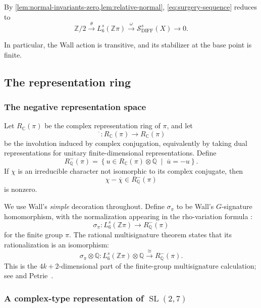 \documentclass[10pt,reqno]{amsart}
\numberwithin{equation}{section}
\theoremstyle{definition}
\theoremstyle{remark}
\newcommand{\Z}{\mathbb Z}
\newcommand{\Q}{\mathbb Q}
\newcommand{\C}{\mathbb C}
\newcommand{\DIFF}{\mathrm{DIFF}}
\newcommand{\cS}{\mathcal S}
\newcommand{\SL}{\operatorname{SL}}
\begin{document}
By \cref{lem:normal-invariants-zero,lem:relative-normal},
\eqref{eq:surgery-sequence} reduces to
\begin{equation}\label{eq:reduced-surgery-sequence}
\Z/2
\xrightarrow{\theta}
L_6^s(\Z\pi)
\xrightarrow{\omega}
\cS^s_{\DIFF}(X)
\longrightarrow0.
\end{equation}

In particular, the Wall action is transitive, and its stabilizer at
the base point is finite.

\subsection{The representation ring}

\subsubsection{The negative representation space}

Let \(R_{\C}(\pi)\) be the complex representation ring of \(\pi\), and
let
\[
\overline{\phantom{x}}\colon R_{\C}(\pi)\longrightarrow R_{\C}(\pi)
\]
be the involution induced by complex conjugation, equivalently by
taking dual representations for unitary finite-dimensional
representations.  Define
\[
R^-_{\Q}(\pi)
=
\left\{
u\in R_{\C}(\pi)\otimes\Q
\;\middle|\;
\overline{u}=-u
\right\}.
\]
If \(\chi\) is an irreducible character not isomorphic to its complex
conjugate, then
\[
\chi-\overline{\chi}\in R^-_{\Q}(\pi)
\]
is nonzero.

We use Wall's \emph{simple} decoration throughout.  Define
\(\sigma_\pi\) to be Wall's \(G\)-signature homomorphism, with the
normalization appearing in the rho-variation formula
\cite[Equation~(1.2)]{CrowleyMacko}:
\[
\sigma_\pi\colon L_6^s(\Z\pi)\longrightarrow R^-_{\Q}(\pi)
\]
for the finite group \(\pi\).  The rational multisignature theorem
states that its rationalization is an isomorphism:
\begin{equation}\label{eq:multisignature-rational}
\sigma_\pi\otimes\Q\colon
L_6^s(\Z\pi)\otimes\Q
\xrightarrow{\;\cong\;}
R^-_{\Q}(\pi).
\end{equation}
This is the \(4k+2\)-dimensional part of the finite-group
multisignature calculation; see
\cite[Theorems~13A.2--13A.4]{Wall} and Petrie~\cite{Petrie}.

\subsubsection{A complex-type representation of
\texorpdfstring{\(\SL(2,7)\)}{SL(2,7)}}
\end{document}
